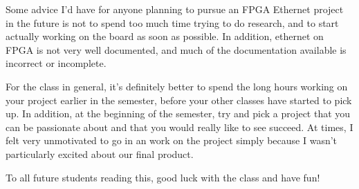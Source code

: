 \documentclass[12pt]{report}
\begin{document}
Some advice I'd have for anyone planning to pursue an FPGA Ethernet project in the future is not to spend too much time trying to do research, and to start actually working on the board as soon as possible. In addition, ethernet on FPGA is not very well documented, and much of the documentation available is incorrect or incomplete.

For the class in general, it's definitely better to spend the long hours working on your project earlier in the semester, before your other classes have started to pick up. In addition, at the beginning of the semester, try and pick a project that you can be passionate about and that you would really like to see succeed. At times, I felt very unmotivated to go in an work on the project simply because I wasn't particularly excited about our final product.

To all future students reading this, good luck with the class and have fun!

\printbibliography
\end{document}
